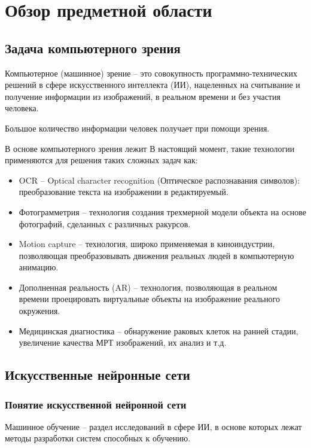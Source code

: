 \section{Обзор предметной области}
\subsection{Задача компьютерного зрения}
Компьютерное (машинное) зрение – это совокупность программно-технических решений в сфере искусственного интеллекта (ИИ), нацеленных на считывание и получение информации из изображений, в реальном времени и без участия человека. 

Большое количество информации человек получает при помощи зрения. 

В основе компьютерного зрения лежит 
В настоящий момент, такие технологии применяются для решения таких сложных задач как:
\begin{itemize}
    \item OCR – Optical character recognition (Оптическое распознавания символов): преобразование текста на изображении в редактируемый.
    \item Фотограмметрия – технология создания трехмерной модели объекта на основе фотографий, сделанных с различных ракурсов.
    \item Motion capture – технология, широко применяемая в киноиндустрии, позволяющая преобразовывать движения реальных людей в компьютерную анимацию.
    \item Дополненная реальность (AR) – технология, позволяющая в реальном времени проецировать виртуальные объекты на изображение реального окружения. 
    \item Медицинская диагностика – обнаружение раковых клеток на ранней стадии, увеличение качества МРТ изображений, их анализ и т.д.
\end{itemize}
\subsection{Искусственные нейронные сети}

\subsubsection{Понятие искусственной нейронной сети}

Машинное обучение – раздел исследований в сфере ИИ, в основе которых лежат методы разработки систем способных к обучению.

